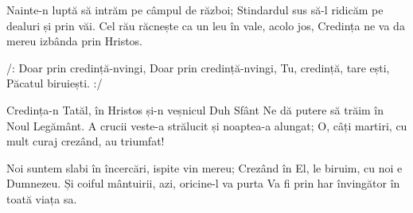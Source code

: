 \beginverse
Nainte-n luptă să intrăm pe câmpul de război;
Stindardul sus să-l ridicăm pe dealuri și prin văi.
Cel rău răcnește ca un leu în vale, acolo jos,
Credința ne va da mereu izbânda prin Hristos.
\endverse

\beginchorus
/: Doar prin credință-nvingi,
Doar prin credință-nvingi,
Tu, credință, tare ești,
Păcatul biruiești. :/
\endchorus

\beginverse
Credința-n Tatăl, în Hristos și-n veșnicul Duh Sfânt
Ne dă putere să trăim în Noul Legământ.
A crucii veste-a strălucit și noaptea-a alungat;
O, câți martiri, cu mult curaj crezând, au triumfat!
\endverse

\beginverse
Noi suntem slabi în încercări, ispite vin mereu;
Crezând în El, le biruim, cu noi e Dumnezeu.
Și coiful mântuirii, azi, oricine-l va purta
Va fi prin har învingător în toată viața sa.
\endverse
\endsong
